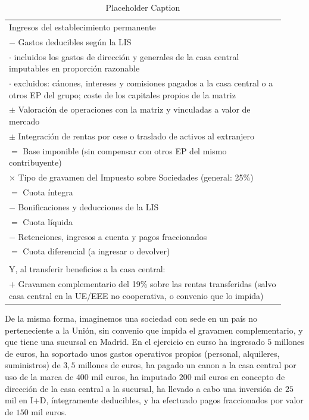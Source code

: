 \documentclass[10pt,a4paper]{article}
\begin{document}
\begin{table}[h]
    \centering
    \caption{Placeholder Caption}
    \label{tab:placeholder_label}
    \begin{tabular}{p{0.92\linewidth}}
        Ingresos del establecimiento permanente \\
        $-$ Gastos deducibles según la LIS \\
        \hspace{1.5em}$\cdot$ incluidos los gastos de dirección y generales de la casa central imputables en proporción razonable \\
        \hspace{1.5em}$\cdot$ excluidos: cánones, intereses y comisiones pagados a la casa central o a otros EP del grupo; coste de los capitales propios de la matriz \\
        $\pm$ Valoración de operaciones con la matriz y vinculadas a valor de mercado \\
        $\pm$ Integración de rentas por cese o traslado de activos al extranjero \\
        \hline
        $=$ Base imponible (sin compensar con otros EP del mismo contribuyente) \\
        $\times$ Tipo de gravamen del Impuesto sobre Sociedades (general: 25\%) \\
        \hline
        $=$ Cuota íntegra \\
        $-$ Bonificaciones y deducciones de la LIS \\
        \hline
        $=$ Cuota líquida \\
        $-$ Retenciones, ingresos a cuenta y pagos fraccionados \\
        \hline
        $=$ Cuota diferencial (a ingresar o devolver) \\
        \\
        Y, al transferir beneficios a la casa central: \\
        $+$ Gravamen complementario del 19\% sobre las rentas transferidas (salvo casa central en la UE/EEE no cooperativa, o convenio que lo impida) \\
    \end{tabular}
\end{table}

De la misma forma, imaginemos una sociedad con sede en un país no perteneciente a la Unión, sin convenio que impida el gravamen complementario, y que tiene una sucursal en Madrid. En el ejercicio en curso ha ingresado $5$ millones de euros, ha soportado unos gastos operativos propios (personal, alquileres, suministros) de $3,5$ millones de euros, ha pagado un canon a la casa central por uso de la marca de $400$ mil euros, ha imputado $200$ mil euros en concepto de dirección de la casa central a la sucursal, ha llevado a cabo una inversión de $25$ mil en I+D, íntegramente deducibles, y ha efectuado pagos fraccionados por valor de $150$ mil euros.
\end{document}
